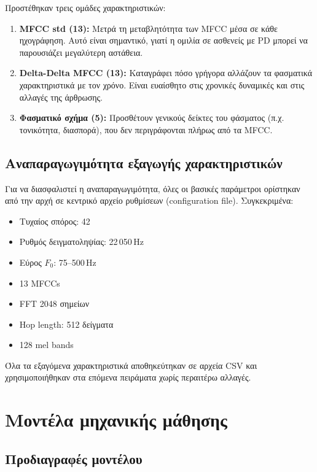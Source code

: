 Προστέθηκαν τρεις ομάδες χαρακτηριστικών:

\begin{enumerate}
    \item \textbf{MFCC std (13):} Μετρά τη μεταβλητότητα των MFCC μέσα σε κάθε ηχογράφηση. Αυτό είναι σημαντικό, γιατί η ομιλία σε ασθενείς με PD μπορεί να παρουσιάζει μεγαλύτερη αστάθεια.
    \item \textbf{Delta-Delta MFCC (13):} Καταγράφει πόσο γρήγορα αλλάζουν τα φασματικά χαρακτηριστικά με τον χρόνο. Είναι ευαίσθητο στις χρονικές δυναμικές και στις αλλαγές της άρθρωσης.
    \item \textbf{Φασματικό σχήμα (5):} Προσθέτουν γενικούς δείκτες του φάσματος (π.χ. τονικότητα, διασπορά), που δεν περιγράφονται πλήρως από τα MFCC.
\end{enumerate}

\subsection{Αναπαραγωγιμότητα εξαγωγής χαρακτηριστικών}

Για να διασφαλιστεί η αναπαραγωγιμότητα, όλες οι βασικές παράμετροι ορίστηκαν από την αρχή σε κεντρικό αρχείο ρυθμίσεων (configuration file). Συγκεκριμένα:

\begin{itemize}
    \item Τυχαίος σπόρος: 42
    \item Ρυθμός δειγματοληψίας: 22\,050\,Hz
    \item Εύρος $F_0$: 75--500\,Hz
    \item 13 MFCCs
    \item FFT 2048 σημείων
    \item Hop length: 512 δείγματα
    \item 128 mel bands
\end{itemize}

Όλα τα εξαγόμενα χαρακτηριστικά αποθηκεύτηκαν σε αρχεία CSV και χρησιμοποιήθηκαν στα επόμενα πειράματα χωρίς περαιτέρω αλλαγές.

\section{Μοντέλα μηχανικής μάθησης}

\subsection{Προδιαγραφές μοντέλου}

